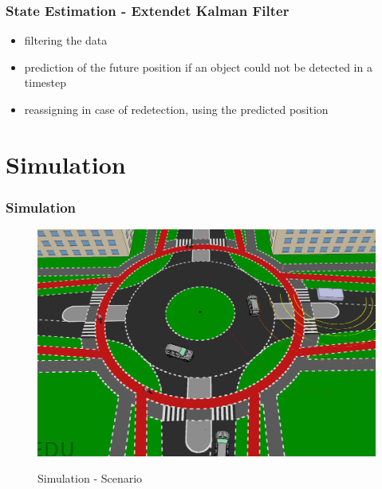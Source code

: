 \documentclass[nosymbols]{beamer}	%
\begin{document}
\begin{frame}
\frametitle{State Estimation - Extendet Kalman Filter}

\begin{itemize}
\item filtering the data
\item prediction of the future position if an object could not be detected in a timestep
\item reassigning in case of redetection, using the predicted position
\end{itemize}


\end{frame}

\section{Simulation}

\begin{frame}
\frametitle{Simulation}
\begin{figure}[!ht]
\begin{center}
\caption{Simulation - Scenario}
\includegraphics[width=\textwidth,height=0.7\textheight,keepaspectratio]{bilder/scenario.png}
\label{obst_cases}
\end{center}
\end{figure}
\end{frame}
\end{document}
